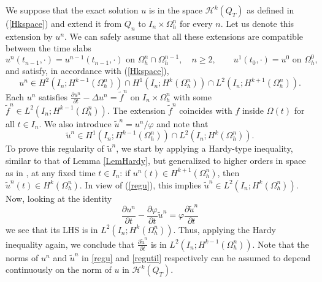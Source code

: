 \documentclass[11pt,a4paper]{article}
\theoremstyle{plain}
\theoremstyle{definition}
\theoremstyle{remark}
\numberwithin{equation}{section}
\begin{document}
We suppose that the exact solution $u$ is in the space $\mathcal{H}^k(Q_T)$ as defined in (\ref{Hkspace}) and
extend it from $Q_n$ to $I_n \times \Omega_h^n$ for every $n$. Let us denote this extension by $u^n$. {We can safely assume that all these extensions are compatible between the time slabs}
\begin{equation}\label{compatExt}
	{u^n(t_{n-1},\cdot)=u^{n-1}(t_{n-1},\cdot) \text{ on } \Omega_h^n\cap\Omega_h^{n-1}, \quad n\geqslant 2, \qquad u^1(t_0,\cdot)=u^0 \text{ on } \Omega_h^0 ,}
\end{equation}
and satisfy, in accordance with (\ref{Hkspace}), 
\begin{equation}
	\label{regu} u^n \in H^2 (I_n ; H^{k - 1} (\Omega_h^n)) \cap H^1 (I_n ; H^k
	(\Omega_h^n)) \cap L^2 (I_n ; H^{k + 1} (\Omega_h^n)) .
\end{equation}
Each $u^n$ satisfies $\frac{\partial u^n}{\partial t} - \Delta u^n =
\tilde{f}^n$ on $I_n \times \Omega_h^n$ with some $\tilde{f}^n \in L^2 (I_n ; H^{k - 1} (\Omega_h^n))$.  The extension $\tilde{f}^n$ coincides with $f$ inside $\Omega (t)$ for all $t \in I_n$.
 We also introduce $\tilde{u}^n = u^n / \varphi$ and note that
\begin{equation}
	\label{regutil} \tilde{u}^n \in H^1 (I_n ; H^{k - 1} (\Omega_h^n)) \cap L^2
	(I_n ; H^k (\Omega_h^n)) .
\end{equation}
To prove this regularity of {$\tilde{u}^n$}, we start by applying {a Hardy-type inequality, similar to that of Lemma \ref{LemHardy}, but generalized to higher orders in space as in  \cite{duprez2020phi}},  at any fixed time $t \in I_n$: if ${u^n} (t) \in H^{k + 1}
(\Omega^n_h)$, then ${\tilde{u}^n} (t) \in H^k (\Omega^n_h)$. In view of (\ref{regu}), this implies $\tilde{u}^n \in L^2 (I_n ; H^k (\Omega_h^n))$.
Now, looking at the identity
\[ \frac{\partial {u^n}}{\partial t} - \frac{\partial \varphi}{\partial t} {\tilde{u}^n}
= \varphi \frac{\partial {\tilde{u}^n}}{\partial t} \]
we see that its LHS is in $L^2 (I_n ; H^k (\Omega_h^n))$. Thus, applying the Hardy inequality again, we conclude that $\frac{\partial {\tilde{u}^n}}{\partial	t}$ is in $L^2 (I_n ; H^{k - 1} (\Omega_h^n))$. Note that the norms of ${u^n}$ and ${\tilde{ u}^n}$ in \eqref{regu} and \eqref{regutil} respectively can be assumed to depend continuously on the norm of $u$ in $\mathcal{H}^k(Q_T)$.
\end{document}
